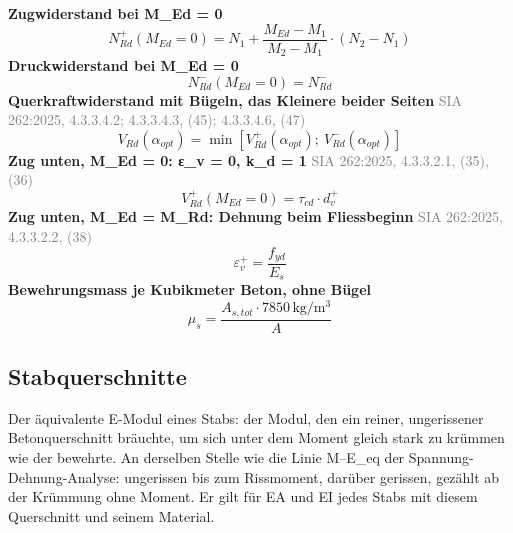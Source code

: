 \documentclass[11pt,a4paper]{article}
\newcommand{\normref}[1]{{\small\textcolor{gray}{#1}}}
\begin{document}
\noindent\textbf{Zugwiderstand bei M\_Ed = 0}
\begin{equation*}
N_{Rd}^{+}(M_{Ed} = 0) = N_1 + \frac{M_{Ed} - M_1}{M_2 - M_1} \cdot \left(N_2 - N_1\right)
\end{equation*}
\noindent\textbf{Druckwiderstand bei M\_Ed = 0}
\begin{equation*}
N_{Rd}^{-}(M_{Ed} = 0) = N_{Rd}^{-}
\end{equation*}
\noindent\textbf{Querkraftwiderstand mit Bügeln, das Kleinere beider Seiten} \hfill \normref{SIA 262:2025, 4.3.3.4.2; 4.3.3.4.3, (45); 4.3.3.4.6, (47)}
\begin{equation*}
V_{Rd}(\alpha_{opt}) = \min\left[V_{Rd}^{+}(\alpha_{opt});\ V_{Rd}^{-}(\alpha_{opt})\right]
\end{equation*}
\noindent\textbf{Zug unten, M\_Ed = 0: ε\_v = 0, k\_d = 1} \hfill \normref{SIA 262:2025, 4.3.3.2.1, (35), (36)}
\begin{equation*}
V_{Rd}^{+}(M_{Ed} = 0) = \tau_{cd} \cdot d_v^{+}
\end{equation*}
\noindent\textbf{Zug unten, M\_Ed = M\_Rd: Dehnung beim Fliessbeginn} \hfill \normref{SIA 262:2025, 4.3.3.2.2, (38)}
\begin{equation*}
\varepsilon_v^{+} = \frac{f_{yd}}{E_s}
\end{equation*}
\noindent\textbf{Bewehrungsmass je Kubikmeter Beton, ohne Bügel}
\begin{equation*}
\mu_s = \frac{A_{s,tot} \cdot 7850\,\mathrm{kg}/\mathrm{m}^{3}}{A}
\end{equation*}
\subsection{Stabquerschnitte}
Der äquivalente E-Modul eines Stabs: der Modul, den ein reiner, ungerissener Betonquerschnitt bräuchte, um sich unter dem Moment gleich stark zu krümmen wie der bewehrte. An derselben Stelle wie die Linie M–E\_eq der Spannung-Dehnung-Analyse: ungerissen bis zum Rissmoment, darüber gerissen, gezählt ab der Krümmung ohne Moment. Er gilt für EA und EI jedes Stabs mit diesem Querschnitt und seinem Material.
\end{document}
